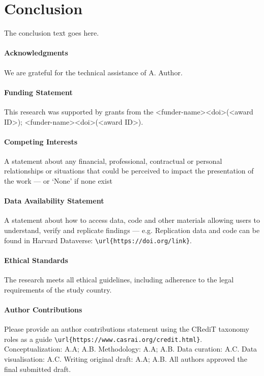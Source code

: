 \documentclass[
  journal=largetwo,
  manuscript=article-type,
  year=2020,
  volume=37,
]{cup-journal}
\begin{document}
\section{Conclusion}
The conclusion text goes here.

\paragraph{Acknowledgments}
We are grateful for the technical assistance of A. Author.

\paragraph{Funding Statement}
This research was supported by grants from the <funder-name><doi>(<award ID>); <funder-name><doi>(<award ID>).

\paragraph{Competing Interests}
A statement about any financial, professional, contractual or personal relationships or situations that could be perceived to impact the presentation of the work --- or `None' if none exist

\paragraph{Data Availability Statement}
A statement about how to access data, code and other materials allowing users to understand, verify and replicate findings --- e.g. Replication data and code can be found in Harvard Dataverse: \verb+\url{https://doi.org/link}+.

\paragraph{Ethical Standards}
The research meets all ethical guidelines, including adherence to the legal requirements of the study country.

\paragraph{Author Contributions}
Please provide an author contributions statement using the CRediT taxonomy roles as a guide {\verb+\url{https://www.casrai.org/credit.html}+}. Conceptualization: A.A; A.B. Methodology: A.A; A.B. Data curation: A.C. Data visualisation: A.C. Writing original draft: A.A; A.B. All authors approved the final submitted draft.
\end{document}
